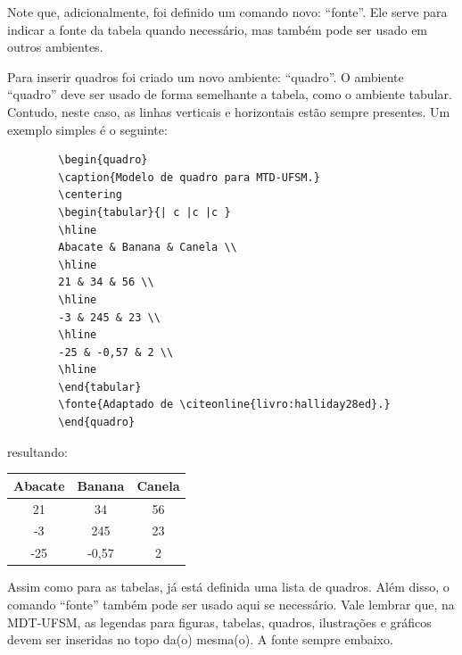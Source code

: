 \documentclass[oneside,openright,12pt]{ufsm_2021} %
\begin{document}
         \par Note que, adicionalmente, foi definido um comando novo: ``fonte''. Ele serve para indicar a fonte da tabela quando necessário, mas também pode ser usado em outros ambientes.
         
         \par Para inserir quadros foi criado um novo ambiente: ``quadro''. O ambiente ``quadro'' deve ser usado de forma semelhante a tabela, como o ambiente tabular. Contudo, neste caso, as linhas verticais e horizontais estão sempre presentes. Um exemplo simples é o seguinte: 
         
         
         \begin{verbatim}
	    \begin{quadro}
   	    \caption{Modelo de quadro para MTD-UFSM.}
	    \centering
	    \begin{tabular}{| c |c |c }
	    \hline
	    Abacate & Banana & Canela \\
	    \hline
	    21 & 34 & 56 \\
	    \hline
	    -3 & 245 & 23 \\
	    \hline
	    -25 & -0,57 & 2 \\
	    \hline
	    \end{tabular}
	    \fonte{Adaptado de \citeonline{livro:halliday28ed}.}
	    \end{quadro}
         \end{verbatim}
         
         \noindent resultando:
         
	    \begin{quadro}
	    \caption{Modelo de quadro para MTD-UFSM.}
	    \centering
	    \begin{tabular}{| c |c |c |}
	    \hline
	    Abacate & Banana & Canela \\
	    \hline
	    21 & 34 & 56 \\
	    \hline
	    -3 & 245 & 23 \\
	    \hline
	    -25 & -0,57 & 2 \\
	    \hline
	    \end{tabular}
	    \end{quadro}
	    
	    
         \noindent Assim como para as tabelas, já está definida uma lista de quadros. Além disso, o comando ``fonte'' também pode ser usado aqui se necessário. Vale lembrar que, na MDT-UFSM, as legendas para figuras, tabelas, quadros, ilustrações e gráficos devem ser inseridas no topo da(o) mesma(o). A fonte sempre embaixo.
         
\end{document}
